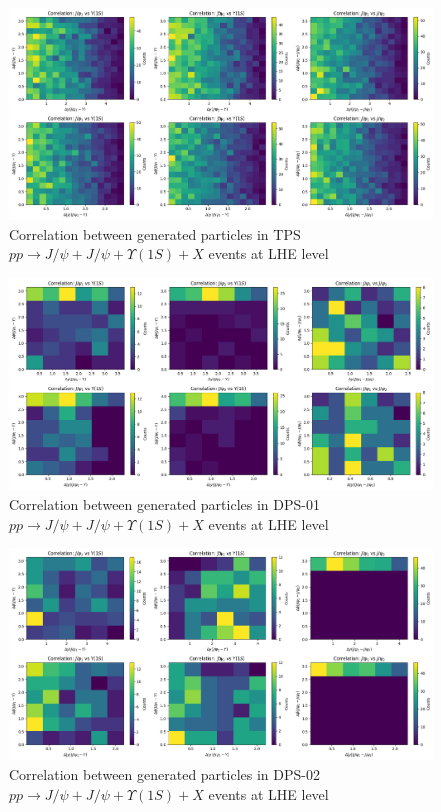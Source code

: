 \documentclass[10pt,twocolumn]{article}
\begin{document}
\begin{figure}
    \centering
    \includegraphics[width=1.0\linewidth]{images/yabs_LHE_LEVEL_TPS_JJY1S_correlation_filtered_p2.png}
    \caption{Correlation between generated particles in TPS $pp\to J/\psi+J/\psi+\Upsilon(1S)+X$ events at LHE level}
    \label{fig:TPS_JJY1S_filtered_correlation_LHE}
\end{figure}

\begin{figure}
    \centering
    \includegraphics[width=1.0\linewidth]{images/yabs_LHE_LEVEL_DPS_JY1S_J_correlation_filtered_p2.png}
    \caption{Correlation between generated particles in DPS-01 $pp\to J/\psi+J/\psi+\Upsilon(1S)+X$ events at LHE level}
    \label{fig:TPS_JJY1S_filtered_correlation_LHE}
\end{figure}

\begin{figure}
    \centering
    \includegraphics[width=1.0\linewidth]{images/yabs_LHE_LEVEL_DPS_JJ_Y1S_correlation_filtered_p2.png}
    \caption{Correlation between generated particles in DPS-02 $pp\to J/\psi+J/\psi+\Upsilon(1S)+X$ events at LHE level}
    \label{fig:TPS_JJY1S_filtered_correlation_LHE}
\end{figure}
\end{document}
